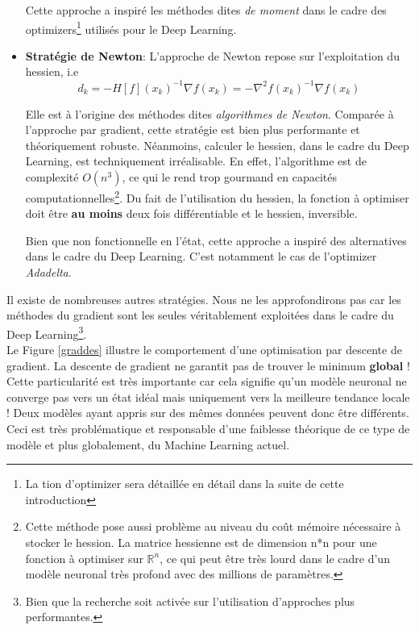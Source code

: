 \begin{itemize}
    Cette approche a inspiré les méthodes dites \textit{de moment} dans le cadre des optimizers\footnote{La tion d'optimizer sera détaillée en détail dans la suite de cette introduction} utilisés pour le Deep Learning.

    \item \textbf{Stratégie de Newton}: L'approche de Newton repose sur l'exploitation du hessien, i.e $$d_k=-H[f](x_k)^{-1}\nabla f(x_k)=-\nabla^2f(x_k)^{-1}\nabla f(x_k)$$

    Elle est à l'origine des méthodes dites \textit{algorithmes de Newton}. Comparée à l'approche par gradient, cette stratégie est bien plus performante et théoriquement robuste. Néanmoins, calculer le hessien, dans le cadre du Deep Learning, est techniquement irréalisable. En effet, l'algorithme est de complexité $O(n^3)$, ce qui le rend trop gourmand en capacités computationnelles\footnote{Cette méthode pose aussi problème au niveau du coût mémoire nécessaire à stocker le hession. La matrice hessienne est de dimension n*n pour une fonction à optimiser sur $\mathbb{R}^n$, ce qui peut être très lourd dans le cadre d'un modèle neuronal très profond avec des millions de paramètres.}. Du fait de l'utilisation du hessien, la fonction à optimiser doit être \textbf{au moins} deux fois différentiable et le hessien, inversible.

    Bien que non fonctionnelle en l'état, cette approche a inspiré des alternatives dans le cadre du Deep Learning. C'est notamment le cas de l'optimizer \textit{Adadelta}.
\end{itemize}

\noindent Il existe de nombreuses autres stratégies. Nous ne les approfondirons pas car les méthodes du gradient sont les seules véritablement exploitées dans le cadre du Deep Learning\footnote{Bien que la recherche soit activée sur l'utilisation d'approches plus performantes.}.\\

\noindent Le Figure \ref{graddes} illustre le comportement d'une optimisation par descente de gradient. La descente de gradient ne garantit pas de trouver le minimum \textbf{global} ! Cette particularité est très importante car cela signifie qu'un modèle neuronal ne converge pas vers un état idéal mais uniquement vers la meilleure tendance locale ! Deux modèles ayant appris sur des mêmes données peuvent donc être différents. Ceci est très problématique et responsable d'une faiblesse théorique de ce type de modèle et plus globalement, du Machine Learning actuel.

